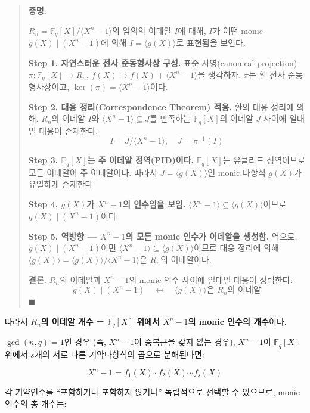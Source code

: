 \documentclass[
  oneside]{article}
\begin{document}
\begin{quote}
\textbf{증명.}

\(R_n = \mathbb{F}_q[X]/ \langle X^n - 1 \rangle\)의 임의의 이데알
\(I\)에 대해, \(I\)가 어떤 monic \(g(X) \mid (X^n - 1)\)에 의해
\(I = \langle g(X) \rangle\)로 표현됨을 보인다.

\textbf{Step 1. 자연스러운 전사 준동형사상 구성.} 표준 사영(canonical
projection) \(\pi : \mathbb{F}_q[X] \to R_n\),
\(f(X) \mapsto f(X) + \langle X^n - 1 \rangle\)을 생각하자. \(\pi\)는 환
전사 준동형사상이고, \(\ker(\pi) = \langle X^n - 1 \rangle\)이다.

\textbf{Step 2. 대응 정리(Correspondence Theorem) 적용.} 환의 대응
정리에 의해, \(R_n\)의 이데알 \(I\)와
\(\langle X^n - 1 \rangle \subseteq J\)를 만족하는 \(\mathbb{F}_q[X]\)의
이데알 \(J\) 사이에 일대일 대응이 존재한다:
\[I = J / \langle X^n - 1 \rangle, \quad J = \pi^{-1}(I)\]

\textbf{Step 3. \(\mathbb{F}_q[X]\)는 주 이데알 정역(PID)이다.}
\(\mathbb{F}_q[X]\)는 유클리드 정역이므로 모든 이데알이 주 이데알이다.
따라서 \(J = \langle g(X) \rangle\)인 monic 다항식 \(g(X)\)가 유일하게
존재한다.

\textbf{Step 4. \(g(X)\)가 \(X^n - 1\)의 인수임을 보임.}
\(\langle X^n - 1 \rangle \subseteq \langle g(X) \rangle\)이므로
\(g(X) \mid (X^n - 1)\)이다.

\textbf{Step 5. 역방향 --- \(X^n - 1\)의 모든 monic 인수가 이데알을
생성함.} 역으로, \(g(X) \mid (X^n - 1)\)이면
\(\langle X^n - 1 \rangle \subseteq \langle g(X) \rangle\)이므로 대응
정리에 의해
\(\langle g(X) \rangle = \langle g(X) \rangle / \langle X^n - 1 \rangle\)은
\(R_n\)의 이데알이다.

\textbf{결론.} \(R_n\)의 이데알과 \(X^n - 1\)의 monic 인수 사이에 일대일
대응이 성립한다:
\[g(X) \mid (X^n - 1) \quad \longleftrightarrow \quad \langle g(X) \rangle \text{은 } R_n\text{의 이데알}\]
\(\blacksquare\)
\end{quote}

따라서 \textbf{\(R_n\)의 이데알 개수 = \(\mathbb{F}_q[X]\) 위에서
\(X^n - 1\)의 monic 인수의 개수}이다.

\(\gcd(n, q) = 1\)인 경우 (즉, \(X^n - 1\)이 중복근을 갖지 않는 경우),
\(X^n - 1\)이 \(\mathbb{F}_q[X]\) 위에서 \(s\)개의 서로 다른
기약다항식의 곱으로 분해된다면:

\[X^n - 1 = f_1(X) \cdot f_2(X) \cdots f_s(X)\]

각 기약인수를 ``포함하거나 포함하지 않거나'' 독립적으로 선택할 수
있으므로, monic 인수의 총 개수는:
\end{document}
